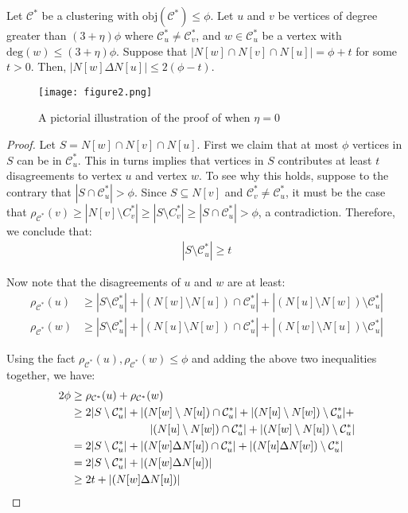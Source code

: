 \begin{lemma}\label{lem:largeintersection}
Let $\mathcal{C}^\ast$ be a clustering with $\text{obj}(\mathcal{C}^{*}) \le \phi.$ Let $u$ and $v$ be vertices of degree greater than $(3+\eta)\phi$ where $\mathcal{C}^{*}_u \neq \mathcal{C}^{*}_v$, and $w \in \mathcal{C}^{*}_u$ be a vertex with $\text{deg}(w) \leq (3+\eta)\phi$. Suppose that $|N[w] \cap N[v] \cap N[u]| = \phi + t$ for some $t>0$. Then, $|N[w] \Delta N[u]| \le 2(\phi - t)$.
\end{lemma}
\begin{figure}
\centering
\texttt{[image: figure2.png]}
\caption{A pictorial illustration of the proof of  when $\eta = 0$}\label{fig:2}
\end{figure}
\begin{proof}
Let $S = N[w] \cap N[v] \cap N[u]$. First we claim that at most $\phi$ vertices in $S$ can be in $\mathcal{C}^{*}_u$. This in turns implies that vertices in $S$ contributes at least $t$ disagreements to vertex $u$ and vertex $w$. To see why this holds, suppose to the contrary that $|S \cap \mathcal{C}^{*}_u| > \phi$. Since $S \subseteq N[v]$ and $\mathcal{C}^{*}_v \neq \mathcal{C}^{*}_u$, it must be the case that $\rho_{\mathcal{C}^{*}}(v) \geq |N[v] \setminus C^{*}_v| \geq |S \setminus C^{*}_v| \geq |S \cap \mathcal{C}^{*}_u| > \phi$, a contradiction. Therefore, we conclude that:
\begin{align}|S \setminus \mathcal{C}^{*}_u| \geq t\end{align}

Now note that the disagreements of $u$ and $w$ are at least:
\begin{align*}
\rho_{\mathcal{C}^{*}}(u) &\geq |S \setminus \mathcal{C}^{*}_u| + |(N[w] \setminus N[u]) \cap \mathcal{C}^{*}_u| + |(N[u] \setminus N[w]) \setminus \mathcal{C}^{*}_u| \\
\rho_{\mathcal{C}^{*}}(w) &\geq |S \setminus \mathcal{C}^{*}_u| + |(N[u] \setminus N[w]) \cap \mathcal{C}^{*}_u| + |(N[w] \setminus N[u]) \setminus \mathcal{C}^{*}_u|
\end{align*}

Using the fact $\rho_{\mathcal{C}^{*}}(u), \rho_{\mathcal{C}^{*}}(w) \leq \phi$ and adding the above two inequalities together, we have:
\begin{align*}
2\phi &\geq \rho_{\mathcal{C}^{*}}(u) + \rho_{\mathcal{C}^{*}}(w) \\
&\geq 2|S \setminus \mathcal{C}^{*}_u| + |(N[w] \setminus N[u]) \cap \mathcal{C}^{*}_u| + |(N[u] \setminus N[w]) \setminus \mathcal{C}^{*}_u| + \\
& \hspace{25mm} |(N[u] \setminus N[w]) \cap \mathcal{C}^{*}_u| + |(N[w] \setminus N[u]) \setminus \mathcal{C}^{*}_u| \\
&= 2|S \setminus \mathcal{C}^{*}_u| + |(N[w] \Delta N[u]) \cap \mathcal{C}^{*}_u | + |(N[u] \Delta N[w]) \setminus \mathcal{C}^{*}_u| \\
&= 2|S \setminus \mathcal{C}^{*}_u| + |(N[w] \Delta N[u])| \\
&\geq 2t + |(N[w] \Delta N[u])|
\end{align*}


\end{proof}
